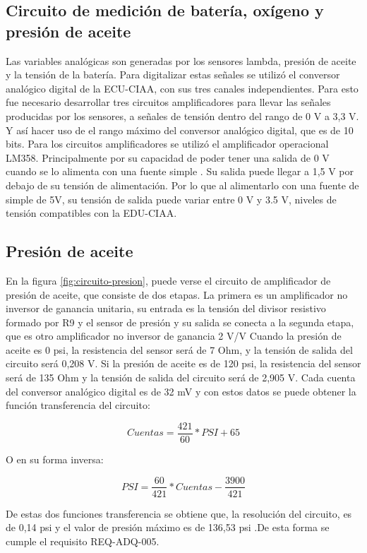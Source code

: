 \subsection{Circuito de medición de batería, oxígeno y presión de aceite}

Las variables analógicas son generadas por los sensores lambda, presión de aceite y la tensión de la batería. Para digitalizar estas señales se utilizó el conversor analógico digital de la ECU-CIAA, con sus tres canales independientes. Para esto fue necesario desarrollar tres circuitos amplificadores para llevar las señales producidas por los sensores, a señales de tensión dentro del rango de 0 V a 3,3 V. Y así hacer uso de el rango máximo del conversor analógico digital, que es de 10 bits. Para los circuitos amplificadores se utilizó el amplificador operacional LM358. Principalmente por su capacidad de poder tener una salida de 0 V cuando se lo alimenta con una fuente simple \cite{lm358}. Su salida puede llegar a 1,5 V por debajo de su tensión de alimentación. Por lo que al alimentarlo con una fuente de simple de 5V, su tensión de salida puede variar entre 0 V y 3.5 V, niveles de tensión compatibles con la EDU-CIAA.

\subsection{Presión de aceite}

En la figura \ref{fig:circuito-presion}, puede verse el circuito de amplificador de presión de aceite, que consiste de dos etapas. La primera es un amplificador no inversor de ganancia unitaria, su entrada es la tensión del divisor resistivo formado por R9 y el sensor de presión y su salida se conecta a la segunda etapa, que es otro amplificador no inversor de ganancia 2 V/V
Cuando la presión de aceite es 0 psi, la resistencia del sensor será de 7 Ohm, y la tensión de salida del circuito será 0,208 V. Si la presión de aceite es de 120 psi, la resistencia del sensor será de 135 Ohm y la tensión de salida del circuito será de 2,905 V. Cada cuenta del conversor analógico digital es de 32 mV y con estos datos se puede obtener la función transferencia del circuito:

\[ Cuentas = \frac{421}{60} * PSI + 65\]

O en su forma inversa:

\[ PSI = \frac{60}{421} * Cuentas - \frac{3900}{421} \]

De estas dos funciones transferencia se obtiene que, la resolución del circuito, es de 0,14 psi y el valor de presión máximo es de 136,53 psi .De esta forma se cumple el requisito REQ-ADQ-005.

